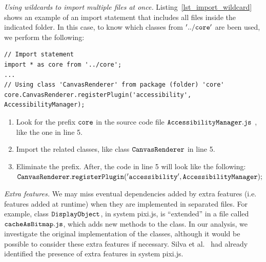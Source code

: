 \documentclass[review]{elsarticle}
\newcommand{\aspas}[1]{{``#1''}}
\newcommand{\mcode}[1]{$\tt #1$}
\begin{document}
\vspace{2.5 mm}

\noindent \textit{Using wildcards to import multiple files at once.} Listing~\ref{lst_import_wildcard} shows an example of an import statement that includes all files inside the indicated folder. In this case, to know which classes from \mcode{'../core'} are been used, we perform the following:

\begin{lstlisting}[caption=Example of import statement using wildcard in class \mcode{AccessibilityManager} in system {\sc pixi.js}, label=lst_import_wildcard, emph={[2]graphicsData},emphstyle={[2]\ttfamily\bfseries\color{darkgreen}}]
// Import statement
import * as core from '../core';
...
// Using class 'CanvasRenderer' from package (folder) 'core'
core.CanvasRenderer.registerPlugin('accessibility', AccessibilityManager);

\end{lstlisting} 
\begin{enumerate}
	\item Look for the prefix \mcode{core} in the source code file \mcode{AccessibilityManager.js} , like the one in line 5.
	\item Import the related classes, like class \mcode{CanvasRenderer} in line 5.
	\item Eliminate the prefix. After, the code in line 5 will look like the following:  \mcode{CanvasRenderer.registerPlugin('accessibility',AccessibilityManager);}
\end{enumerate}

\vspace{2.5 mm}

\noindent \textit{Extra features.} We may miss eventual dependencies added by extra features (i.e. features added at runtime) when they are implemented in separated files. For example, class \mcode{DisplayObject}, in system {\sc pixi.js}, is \aspas{extended} in a file called \mcode{cacheAsBitmap.js}, which adds new methods to the class. In our analysis, we investigate the original implementation of the classes, although it would be possible to consider these extra features if necessary. Silva et al.~\cite{icsr2017} had already identified the presence of extra features in system {\sc pixi.js}. 
\end{document}
